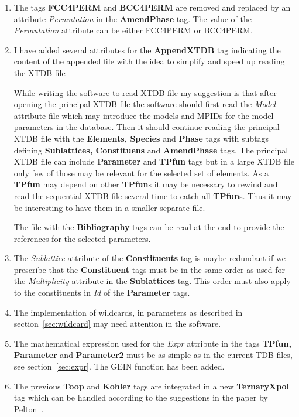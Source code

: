 \documentclass{article}
\begin{document}
\begin{appendices}
\begin{enumerate}
\item The tags {\bf FCC4PERM} and {\bf BCC4PERM} are removed and
  replaced by an attribute {\em Permutation} in the {\bf AmendPhase}
  tag.  The value of the {\em Permutation} attribute can be either
  FCC4PERM or BCC4PERM.

\item I have added several attributes for the {\bf AppendXTDB} tag
  indicating the content of the appended file with the idea to
  simplify and speed up reading the XTDB file

  While writing the software to read XTDB file my suggestion is that
  after opening the principal XTDB file the software should first read
  the {\em Model} attribute file which may introduce the models and
  MPIDs for the model parameters in the database.  Then it should
  continue reading the principal XTDB file with the {\bf Elements,
    Species} and {\bf Phase} tags with subtags defining {\bf
    Sublattices, Constituens} and {\bf AmendPhase} tags.  The
  principal XTDB file can include {\bf Parameter} and {\bf TPfun} tags
  but in a large XTDB file only few of those may be relevant for the
  selected set of elements.  As a {\bf TPfun} may depend on other {\bf
    TPfun}s it may be necessary to rewind and read the sequential XTDB
  file several time to catch all {\bf TPfun}s.  Thus it may be
  interesting to have them in a smaller separate file.

  The file with the {\bf Bibliography} tags can be read at the end to
  provide the references for the selected parameters.

\item The {\em Sublattice} attribute of the {\bf Constituents} tag is
  maybe redundant if we prescribe that the {\bf Constituent} tags must
  be in the same order as used for the {\em Multiplicity} attribute in
  the {\bf Sublattices} tag.  This order must also apply to the
  constituents in {\em Id} of the {\bf Parameter} tags.

\item The implementation of wildcards, in parameters as described in
  section~\ref{sec:wildcard} may need attention in the software.

\item The mathematical expression used for the {\em Expr} attribute in
  the tags {\bf TPfun, Parameter} and {\bf Parameter2} must be as
  simple as in the current TDB files, see section~\ref{sec:expr}.  The
  GEIN function has been added.

\item The previous {\bf Toop} and {\bf Kohler} tags are integrated in
  a new {\bf TernaryXpol} tag which can be handled according to the
  suggestions in the paper by Pelton~\cite{01Pel}.

\end{enumerate}

\end{appendices}
\end{document}
